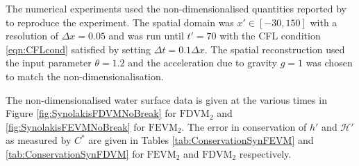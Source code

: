 The numerical experiments used the non-dimensionalised quantities reported by \citet{Synolakis-1987-523} to reproduce the experiment. The spatial domain was $x' \in [-30,150]$ with a resolution of $\Delta x = 0.05$ and was run until $t' = 70$ with the CFL condition \eqref{eqn:CFLcond} satisfied by setting $\Delta t = 0.1 \Delta x$. The spatial reconstruction used the input parameter $\theta = 1.2$ and the acceleration due to gravity $g= 1$ was chosen to match the non-dimensionalisation.

The non-dimensionalised water surface data is given at the various times in Figure \ref{fig:SynolakisFDVMNoBreak} for $\text{FDVM}_2$ and \ref{fig:SynolakisFEVMNoBreak} for $\text{FEVM}_2$. The error in conservation of $h'$ and $\mathcal{H}'$ as measured by $C^*$ are given in Tables \ref{tab:ConservationSynFEVM} and \ref{tab:ConservationSynFDVM} for $\text{FEVM}_2$ and $\text{FDVM}_2$ respectively. 

